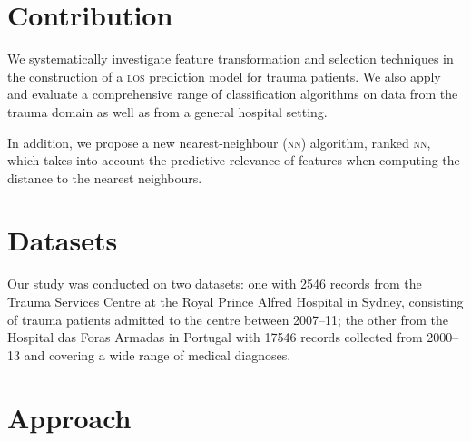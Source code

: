 \documentclass[portrait]{usydposter}
\newcommand{\acronym}[1]{\textsc{#1}\xspace}
\newcommand{\los}{\acronym{los}}
\newcommand{\nn}{\acronym{nn}}
\begin{document}
\begin{multicols}{3}
\section{Contribution}
\noindent We systematically investigate feature transformation and selection
techniques in the construction of a \los prediction model for trauma patients.
We also apply and evaluate a comprehensive range of
classification algorithms on data from the trauma domain as well as from a
general hospital setting.

In addition, we
propose a new nearest-neighbour (\nn) algorithm, ranked \nn, which takes
into account the
predictive relevance of features when computing the distance to the nearest
neighbours.

\section{Datasets}
\noindent Our study was conducted on two datasets: one with 2546 records from
the Trauma Services Centre at the Royal Prince Alfred Hospital in Sydney,
consisting of
trauma patients admitted to the centre between 2007--11;
the other from the Hospital das
Foras Armadas in Portugal with 17546 records collected from 2000--13 and
covering a wide range of medical diagnoses.

\section{Approach}

\end{multicols}
\end{document}
